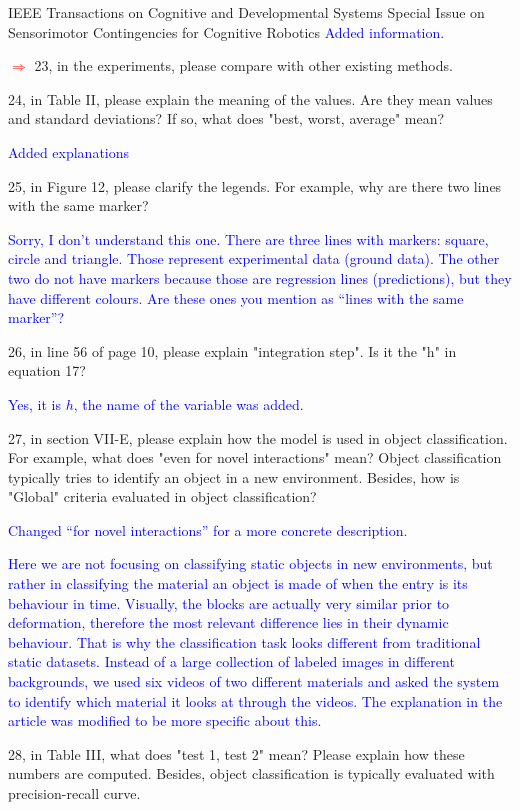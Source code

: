 \documentclass[a4paper,12pt]{letter}
\newcommand{\comment}[1]{\textcolor{blue}{#1}}
\newcommand{\marker}{\hspace*{-1.6em}\textcolor{red}{$\Longrightarrow$}}
\begin{document}
\begin{letter}{IEEE Transactions on Cognitive and Developmental Systems\newline
Special Issue on Sensorimotor Contingencies for Cognitive Robotics}
\comment{Added information.}

\marker
23, in the experiments, please compare with other existing methods.


24, in Table II, please explain the meaning of the values. Are they mean values and standard deviations? If so, what does "best, worst, average" mean?

\comment{Added explanations}

25, in Figure 12, please clarify the legends. For example, why are there two lines with the same marker?

\comment{Sorry, I don't understand this one.  There are three lines with markers: square, circle and triangle.  Those represent experimental data (ground data).  The other two do not have markers because those are regression lines (predictions), but they have different colours.  Are these ones you mention as ``lines with the same marker''?}

26, in line 56 of page 10, please explain "integration step". Is it the "h" in equation 17?

\comment{Yes, it is $h$, the name of the variable was added.}

27, in section VII-E, please explain how the model is used in object classification. For example, what does "even for novel interactions" mean? Object classification typically tries to identify an object in a new environment. Besides, how is "Global" criteria evaluated in object classification? 

\comment{Changed ``for novel interactions'' for a more concrete description.}

\comment{Here we are not focusing on classifying static objects in new environments, but rather in classifying the material an object is made of when the entry is its behaviour in time.  Visually, the blocks are actually very similar prior to deformation, therefore the most relevant difference lies in their dynamic behaviour.  That is why the classification task looks different from traditional static datasets.  Instead of a large collection of labeled images in different backgrounds, we used six videos of two different materials and asked the system to identify which material it looks at through the videos.  The explanation in the article was modified to be more specific about this.}

28, in Table III, what does "test 1, test 2" mean? Please explain how these numbers are computed. Besides, object classification is typically evaluated with precision-recall curve.


\end{letter}
\end{document}

